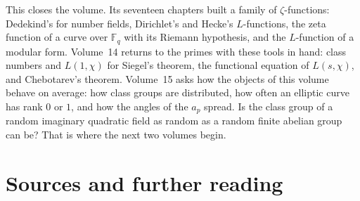 This closes the volume. Its seventeen chapters built a family of $\zeta$-functions: Dedekind's for number fields, Dirichlet's and Hecke's $L$-functions, the zeta
function of a curve over $\mathbb F_q$ with its Riemann hypothesis, and the $L$-function of a modular form. Volume~14 returns to the primes with these tools in
hand: class numbers and $L(1,\chi)$ for Siegel's theorem, the functional equation of $L(s,\chi)$, and Chebotarev's theorem. Volume~15 asks how the objects of this
volume behave on average: how class groups are distributed, how often an elliptic curve has rank $0$ or $1$, and how the angles of the $a_p$ spread. Is the class group
of a random imaginary quadratic field as random as a random finite abelian group can be? That is where the next two volumes begin.

\section*{Sources and further reading}


